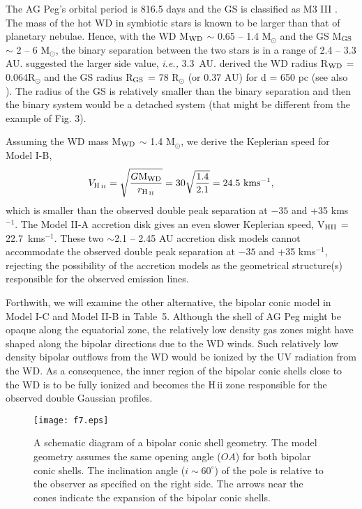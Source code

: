 \documentclass[a4paper,fleqn,usenatbib,useAMS]{mnras}
\def\ie{{\it i.e.,} }
\def\hii{H\,{\sc ii}}
\def\kms{km\hspace{1pt}s$^{-1}$}
\begin{document}
{The AG Peg's orbital period is 816.5 days and the GS is classified as M3 III \citep{sch88}. The mass of the hot WD in symbiotic stars is known to be larger than that of planetary nebulae. Hence, with the WD M$_{\rm WD}$ $\sim$ 0.65 -- 1.4 M$_{\odot}$ and the GS M$_{\rm GS}$ $\sim$ 2 -- 6 M$_{\odot}$, the binary separation {between the two stars} is in a range of 2.4 -- 3.3 AU.
\citet{form90} suggested the larger side value, \ie 3.3~AU. \citet{con97} derived  the WD radius R$_{\rm WD}$ = 0.064R$_\odot$ and the GS radius R$_{\rm GS}$ = 78 R$_\odot$ (or 0.37 AU) for d = 650 pc (see also \citealt{mur95}). The radius of the GS is relatively smaller than the binary separation and then the binary system would be a detached system (that might be different from the example of Fig. 3).

Assuming the WD mass M$_{\rm WD}$ $\sim$ 1.4 M$_{\odot}$, we derive the Keplerian speed for Model I-B,
$$
{V_{\rm H\,_{\sc II}}} = \sqrt{\frac{G{\rm M_{\rm WD}}}{{r_{\rm H\,_{\sc II}}}}} = 30 \sqrt{\frac{1.4}{2.1} } = 24.5~ {\rm km s^{-1}},
$$
which is smaller than the observed double peak separation at $-35$ and +35 {\kms}. The Model II-A accretion disk gives an even slower Keplerian speed, V$_{\rm HII}$  =  22.7~{\kms}. These two $\sim$2.1 -- 2.45 AU accretion disk models cannot accommodate the observed double peak separation at $-35$ and +35 {\kms}, rejecting the possibility of the accretion models as the geometrical structure(s) responsible for the observed emission lines.

Forthwith, we will examine the other alternative, the bipolar conic model in Model I-C and Model II-B in Table~5. Although the shell of AG Peg might be opaque along the equatorial zone, the relatively low density gas zones might have shaped along the bipolar directions due to the WD winds. Such relatively low density bipolar outflows from the WD would be ionized by the UV radiation from the WD. As a consequence, the inner region of the bipolar conic shells close to the WD is to be fully ionized and becomes the {\hii} zone responsible for the observed double Gaussian profiles.

{%


\begin{figure}
  \centering
\texttt{[image: f7.eps]}
\caption{A schematic diagram of a bipolar conic shell geometry. The model geometry assumes the same opening angle ($OA$) for both bipolar conic shells. The inclination angle ($i \sim 60^{\circ}$) of the pole is relative to the observer as specified on the right side. The arrows near the cones indicate the expansion of the bipolar conic shells. }
\label{fig7}
\end{figure}




}}
\end{document}
